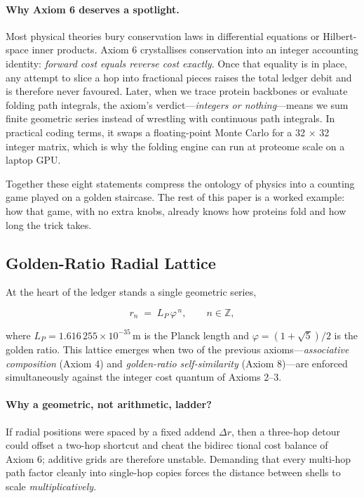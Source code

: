 \documentclass[11pt]{article}
\newcommand{\phiGR}{\varphi}                 %
\newcommand{\LP}{L_{\!P}}                    %
\begin{document}
\paragraph{Why Axiom 6 deserves a spotlight.}
Most physical theories bury conservation laws in differential equations
or Hilbert-space inner products.  Axiom 6 crystallises conservation into
an integer accounting identity: \emph{forward cost equals reverse cost
exactly}.  Once that equality is in place, any attempt to slice a hop
into fractional pieces raises the total ledger debit and is therefore
never favoured.  Later, when we trace protein backbones or evaluate
folding path integrals, the axiom’s verdict—\emph{integers or
nothing}—means we sum finite geometric series instead of wrestling with
continuous path integrals.  In practical coding terms, it swaps a
floating-point Monte Carlo for a 32 × 32 integer matrix, which is why
the folding engine can run at proteome scale on a laptop GPU.

Together these eight statements compress the ontology of physics into a
counting game played on a golden staircase.  The rest of this paper is a
worked example: how that game, with no extra knobs, already knows how
proteins fold and how long the trick takes.

\subsection{Golden-Ratio Radial Lattice}\label{sec:gr-lattice}

At the heart of the ledger stands a single geometric series,

\[
r_{n} \;=\; \LP \,\phiGR^{\,n},
\qquad n\in\mathbb Z,
\]

where \(\LP\!=\!1.616\,255\times10^{-35}\,\text{m}\) is the Planck
length and \(\phiGR=(1+\sqrt5)/2\) is the golden ratio.  This lattice
emerges when two of the previous axioms—\emph{associative composition}
(Axiom 4) and \emph{golden-ratio self-similarity} (Axiom 8)—are enforced
simultaneously against the integer cost quantum of Axioms 2–3.

\paragraph{Why a geometric, not arithmetic, ladder?}
If radial positions were spaced by a fixed addend \(\Delta r\), then a
three-hop detour could offset a two-hop shortcut and cheat the bidirec­
tional cost balance of Axiom 6; additive grids are therefore unstable.
Demanding that every multi-hop path factor cleanly into single-hop
copies forces the distance between shells to scale \emph{multiplicatively}.
\end{document}

